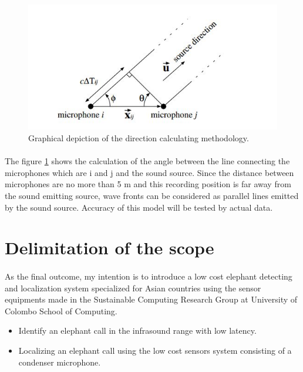 \documentclass[11pt]{article}
\numberwithin{figure}{section}
\numberwithin{table}{section}
\begin{document}
\begin{figure}[h]
\centering
\includegraphics[width= \textwidth]{d.jpg}
\caption{ \cite {17}Graphical depiction of the direction calculating methodology.}
\label{d:logo}
\end{figure}

\paragraph{}
The figure \ref{d:logo} shows the calculation of the angle between the line connecting the microphones which are i and j and the sound source. Since the distance between microphones are no more than 5 m and this recording position is far away from the sound emitting source, wave fronts can be considered as parallel lines emitted by the sound source. Accuracy of this model will be tested by actual data.

\section{Delimitation of the scope}
\paragraph{}
As the final outcome, my intention is to introduce a low cost elephant detecting and localization system specialized for Asian countries using the sensor equipments made in the Sustainable Computing Research Group at University of Colombo School of Computing.

\begin{flushleft}
\end{flushleft}

\begin{itemize}

\item 	Identify an elephant call in the infrasound range with low latency.
\item 	Localizing an elephant call using the low cost sensors system consisting of a condenser microphone.
\end{itemize}
\end{document}
